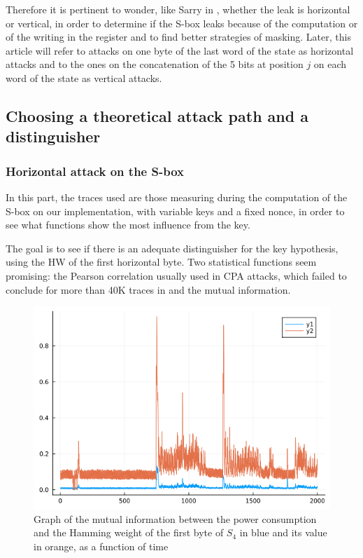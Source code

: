 \documentclass[a4paper,11pt,twocolumn]{article}
\begin{document}
	Therefore it is pertinent to wonder, like Sarry in \cite{these}, whether the leak is horizontal or vertical, in order to determine if the S-box leaks because of the computation or of the writing in the register and to find better strategies of masking. Later, this article will refer to attacks on one byte of the last word of the state as horizontal attacks and to the ones on the concatenation of the 5 bits at position $j$ on each word of the state as vertical attacks.
	
	\subsection{Choosing a theoretical attack path and a distinguisher} \label{choice}
	\subsubsection{Horizontal attack on the S-box}
	In this part, the traces used are those measuring during the computation of the S-box on our implementation, with variable keys and a fixed nonce, in order to see what functions show the most influence from the key.
	
	The goal is to see if there is an adequate distinguisher for the key hypothesis, using the HW of the first horizontal byte. Two statistical functions seem promising: the Pearson correlation usually used in CPA attacks, which failed to conclude for more than 40K traces in \cite{dl_cpa} and the mutual information.
	
	\begin{figure}[h]
		\centering
		\includegraphics[scale=0.3]{horizontal_one_byte}
		\caption{Graph of the mutual information between the power consumption and the Hamming weight of the first byte of $S_4$ in blue and its value in orange, as a function of time}
		\label{hHW&val}
	\end{figure}
	
\end{document}
